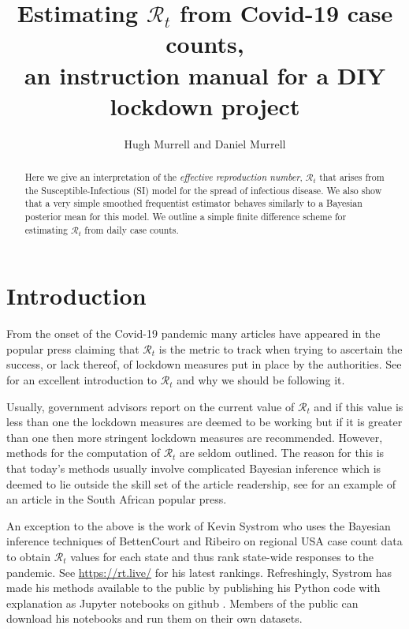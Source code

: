 \documentclass[11pt]{article}
\begin{document}
\title{Estimating $\mathcal{R}_t$ from Covid-19 case counts, \\
an instruction manual for a DIY lockdown project }
\author{ Hugh Murrell and Daniel Murrell}
\maketitle

\begin{abstract}
\noindent Here we give an interpretation of
the {\it effective reproduction number}, $\mathcal{R}_t$ that arises
from the Susceptible-Infectious (SI) model 
for the spread of infectious disease. We also show that
a very simple smoothed frequentist estimator behaves 
similarly to a Bayesian posterior mean for this model.
We outline a simple  finite difference scheme for
estimating $\mathcal{R}_t$ from daily case counts.
\end{abstract}

\section{Introduction}

From the onset of the Covid-19 pandemic many articles have appeared
in the popular press claiming that $\mathcal{R}_t$ is the metric to track when trying
to ascertain the success, or lack thereof, of lockdown measures put in place
by the authorities. See \cite{groundup} for an excellent introduction to 
$\mathcal{R}_t$ and why we should be following it. 

Usually, government advisors report on the current value of $\mathcal{R}_t$
and if this value is less than one the lockdown measures are deemed to be working
but if it is greater than one then more stringent lockdown measures are recommended.
However, methods for the computation of $\mathcal{R}_t$ are seldom outlined.
The reason for this is that today's methods usually involve complicated
Bayesian inference which is deemed to lie outside the skill set of the article 
readership, see \cite{news24} for an example of an article in the South African
popular press.

An exception to the above is the work of Kevin Systrom who uses the 
Bayesian inference techniques of BettenCourt and Ribeiro \cite{bettencourt}
on regional USA case count data to obtain $\mathcal{R}_t$
values for each state and thus rank state-wide responses to the pandemic. See
\href{https://rt.live/}{https://rt.live/} for his latest rankings. 
Refreshingly, Systrom has made his methods available to the public by publishing 
his Python code with explanation as Jupyter notebooks on github \cite{systrom}.
Members of the public can download his notebooks and run them on their
own datasets.
\end{document}
